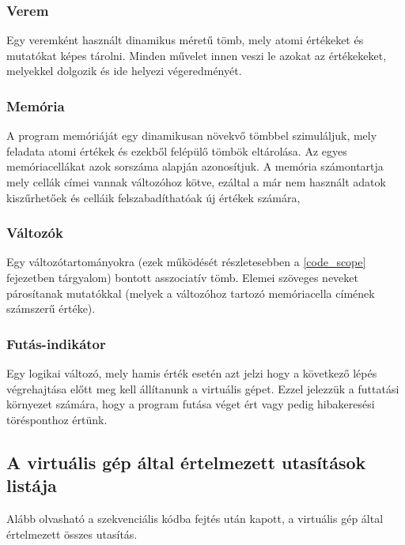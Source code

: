 \subsubsection{Verem} 

Egy veremként használt dinamikus méretű tömb, mely atomi értékeket és mutatókat képes tárolni. Minden művelet innen veszi le azokat az értékekeket, melyekkel dolgozik és ide helyezi végeredményét.

\subsubsection{Memória}

A program memóriáját egy dinamikusan növekvő tömbbel szimuláljuk, mely feladata atomi értékek és ezekből felépülő tömbök eltárolása. Az egyes memóriacellákat azok sorszáma alapján azonosítjuk. A memória számontartja mely cellák címei vannak változóhoz kötve, ezáltal a már nem használt adatok kiszűrhetőek és celláik felszabadíthatóak új értékek számára,

\subsubsection{Változók} 

Egy változótartományokra (ezek működését részletesebben a \ref{code_scope} fejezetben tárgyalom) bontott asszociatív tömb. Elemei szöveges neveket párosítanak mutatókkal (melyek a változóhoz tartozó memóriacella címének számszerű értéke).

\subsubsection{Futás-indikátor} 

Egy logikai változó, mely hamis érték esetén azt jelzi hogy a következő lépés végrehajtása előtt meg kell állítanunk a virtuális gépet. Ezzel jelezzük a futtatási környezet számára, hogy a program futása véget ért vagy pedig hibakeresési törésponthoz értünk.

\subsection{A virtuális gép által értelmezett utasítások listája}
\label{sec:vminsts}

Alább olvasható a szekvenciális kódba fejtés után kapott, a virtuális gép által értelmezett összes utasítás.

\newcommand{\codetable}[3]{
\minipage[t]{\linewidth}\vspace{-8pt}
    \begin{center}
        \captionof{table}{#1\label{#2}}
        \begin{tabularx}{\textwidth}{ l l X }
            \hline
            \multicolumn{1}{c}{\bfseries{Utasítás}} &
            \multicolumn{1}{c}{\bfseries{Paraméter}} &
            \multicolumn{1}{c}{\bfseries{Leírás}} \\
            \hline
            #3
            \hline
        \end{tabularx}
    \end{center}
\endminipage
}

